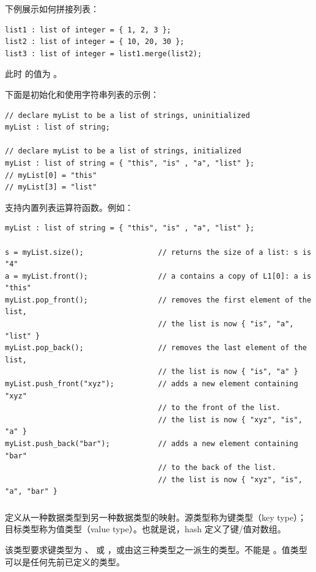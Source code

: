 下例展示如何拼接列表：
\begin{lstlisting}[style=pxl]
list1 : list of integer = { 1, 2, 3 };
list2 : list of integer = { 10, 20, 30 };
list3 : list of integer = list1.merge(list2);
\end{lstlisting}

此时  的值为 。

下面是初始化和使用字符串列表的示例：
\begin{lstlisting}[style=pxl]
// declare myList to be a list of strings, uninitialized
myList : list of string;

// declare myList to be a list of strings, initialized
myList : list of string = { "this", "is" , "a", "list" };
// myList[0] = "this"
// myList[3] = "list"
\end{lstlisting}

支持内置列表运算符函数。例如：
\begin{lstlisting}[style=pxl]
myList : list of string = { "this", "is" , "a", "list" };

s = myList.size();                 // returns the size of a list: s is "4"
a = myList.front();                // a contains a copy of L1[0]: a is "this"
myList.pop_front();                // removes the first element of the list,
                                   // the list is now { "is", "a", "list" }
myList.pop_back();                 // removes the last element of the list,
                                   // the list is now { "is", "a" }
myList.push_front("xyz");          // adds a new element containing "xyz"
                                   // to the front of the list.
                                   // the list is now { "xyz", "is", "a" }
myList.push_back("bar");           // adds a new element containing "bar"
                                   // to the back of the list.
                                   // the list is now { "xyz", "is", "a", "bar" }
\end{lstlisting}

\subsubsection{}

定义从一种数据类型到另一种数据类型的映射。源类型称为键类型（key type）；目标类型称为值类型（value type）。也就是说，hash 定义了键/值对数组。

该类型要求键类型为 、 或 ，或由这三种类型之一派生的类型。不能是 。值类型可以是任何先前已定义的类型。

